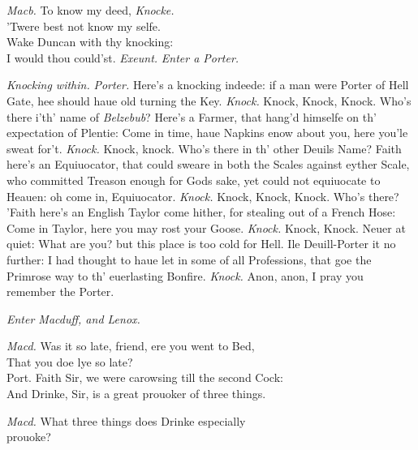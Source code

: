 \documentclass[12pt]{sides}
\newcommand{\clStageDir}[1]{\hspace*{\fill}\textit{#1}\hspace*{\fill}}
\newcommand{\elStageDir}[1]{\hfill\textit{#1}}
\newcommand{\dia}[1]{\hskip 15pt\textit{#1}\hskip 6pt}
\begin{document}
\begin{multicols}{2}
            \dia{Macb.} To know my deed, \clStageDir{Knocke.} \hspace{11pt} \\ 'Twere best not know my selfe. \\ Wake Duncan with thy knocking: \\I would thou could'st. \elStageDir{Exeunt.} \hspace{40pt}
            \clStageDir{Enter a Porter.}
            
            \elStageDir{Knocking within.}
            \dia{Porter.} Here's a knocking indeede: if a man were Porter of Hell Gate, hee should haue old turning the Key. \hspace{8pt} \textit{Knock.} \hspace{8pt} Knock, Knock, Knock. Who's there i'th' name of \textit{Belzebub}? Here's a Farmer, that hang'd himselfe on th' expectation of Plentie: Come in time, haue Napkins enow about you, here you'le sweat for't. \textit{Knock.} Knock, knock. Who's there in th' other Deuils Name? Faith here's an Equiuocator, that could sweare in both the Scales against eyther Scale, who committed Treason enough for Gods sake, yet could not equiuocate to Heauen: oh come in, Equiuocator. \hspace{8pt} \textit{Knock.} \hspace{8pt} Knock, Knock, Knock. Who's there? 'Faith here's an English Taylor come hither, for stealing out of a French Hose: Come in Taylor, here you may rost your Goose. \textit{Knock.} Knock, Knock. Neuer at quiet: What are you? but this place is too cold for Hell. Ile Deuill-Porter it no further: I had thought to haue let in some of all Professions, that goe the Primrose way to th' euerlasting Bonfire. \textit{Knock.} Anon, anon, I pray you remember the Porter.

            \clStageDir{Enter Macduff, and Lenox.}
            
            \dia{Macd.} Was it so late, friend, ere you went to Bed, \\ That you doe lye so late? \\   Port. Faith Sir, we were carowsing till the second Cock: \\ And Drinke, Sir, is a great prouoker of three things.

            \dia{Macd.} What three things does Drinke especially \\ prouoke?


\end{multicols}
\end{document}
